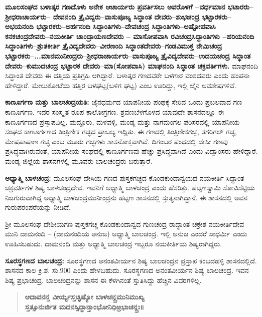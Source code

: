 \textbf{ಮೂಲಸಂಘದ ಬಳಾತ್ಕರ ಗಣದೊಳು ಅನೇಕ ಆಚಾರ್ಯರು ಪ್ರವರ್ತಿಸಲು ಅವರೊಳಗೆ –ವರ್ಧಮಾನ ಭಟಾರರು– ಶ‍್ರೀಧರಾಚಾರ್ಯರು– ದೇವನಂದಿ ತ್ರೈವಿದ್ಯರು–ವಾಸುಪೂಜ್ಯ ಸಿದ್ಧಾಂತ ದೇವರು–ಶುಭಚಂದ್ರ ಭಟ್ಟಾರಕರು–ಅಭಯನಂದಿ ಭಟ್ಟಾರಕರು–ಅರ್ಹನಂದಿ ಸಿದ್ಧಾಂತಿಗಳು–ದೇವಚಂದ್ರ ಸಿದ್ಧಾಂತಿಗಳು–ಅಷ್ಟೋಪವಾಸಿ ಕನಕಚಂದ್ರದೇವರು–ನಯಕೀರ್ತಿ ಚಾಂದ್ರಾಯಣದೇವರು – ಮಾಸೋಪವಾಸಿ ರವಿಚಂದ್ರಸಿದ್ಧಾಂತಿಗಳು –ಹರಿಯನಂದಿ ಸಿದ್ಧಾಂತಿಗಳು–ಶ್ರುತಕೀರ್ತಿ ತ್ರೈವಿದ್ಯದೇವರು–ವೀರಣಂದಿ ಸಿದ್ಧಾಂತದೇವರು–ಗಂಡವಿಮುಕ್ತ ನೇಮಿಚಂದ್ರ ಭಟ್ಟಾರಕರು–...ಮಾನಮುನೀಂದ್ರರು–ಶ‍್ರೀಧರಾಚಾರ್ಯರು–ವಾಸುಪೂಜ್ಯ ತ್ರೈವಿದ್ಯದೇವರು–ಉದಯಚಂದ್ರ ಸಿದ್ಧಾಂತ ದೇವರು–ಕುಮುದಚಂದ್ರ ಭಟ್ಟಾರಕ ದೇವರು–ಮಾ(ಸೋಪವಾಸಿ) ಮಾಘನಂದಿ ಸಿದ್ಧಾಂತ ಚಕ್ರವರ್ತಿಗಳು. }ಮಾಘನಂದಿ ಸಿದ್ಧಾಂತ ದೇವರು ಈ ದತ್ತಿಯ ಪ್ರತಿಗ್ರಹಿ ಆಗಿದ್ದಾರೆ. ಬಳಾತ್ಕರ ಗಣದವರೇ ಬಳಗಾರ ವಂಶದವರು ಎಂದು ಹಂಪನಾ ಹೇಳಿದ್ದಾರೆ. ಮೇಲುಕೋಟೆಯ ಹತ್ತಿರ ಬಳಘಟ್ಟ(ಬಳಿಗ ಘಟ್ಟ) ಎಂಬ ಊರಿದ್ದು, ಇಲ್ಲಿ ಜೈನ ಅವಶೇಷಗಳಿವೆ.

\textbf{ಕಾಣೂರ್ಗಣ ಮತ್ತು ಬಾಲಚಂದ್ರಯತಿ:} ಜೈನಧರ್ಮದ ಯಾಪನೀಯ ಪಂಥಕ್ಕೆ ಸೇರಿದ ಒಂದು ಪ್ರಬಲವಾದ ಗಣ ಕಾಣೂರ್ಗಣ. ಇದರ ಸಂಸ್ಕೃತ ರೂಪ ಕಾಲೋಗ್ರಗಣ. ಶ್ರವಣಬೆಳಗೊಳದ ಯಾವುದೇ ಶಾಸನದಲ್ಲೂ ಈ ಕಾಣೂರ್ಗಣದ ಪ್ರಸ್ತಾಪವಿಲ್ಲ. ಮದ್ದೂರು, ಮಳವಳ್ಳಿ, ಮಂಡ್ಯ ಮತ್ತು ನಾಗಮಂಗಲ ಪರಿಸರದಲ್ಲಿ ಯಾಪನೀಯ ಸಂಘದ ಕಾಣೂರ್ಗಣದ ತಿಂತ್ರಿಣೀಕ ಗಚ್ಛದ ಪ್ರಾಬಲ್ಯ ಇದ್ದಿತು. ಈ ಗಣದಲ್ಲಿ ತಿಂತ್ರಿಣೀಕಗಚ್ಛ, ತಗರಿಗಲ್​ ಗಚ್ಛ, ಮೇಷಪಾಷಾಣ ಗಚ್ಛ ಎಂಬ ಮೂರು ಗಚ್ಛಗಳು ಶಾಸನೋಕ್ತವಾಗಿವೆ. ದಿಗಂಬರ ಪಂಥದಲ್ಲಿ ದೇಸೀ ಗಣವು ಪ್ರಸಿದ್ಧವಾಗಿರುವಂತೆ, ಯಾಪನೀಯ ಸಂಘದಲ್ಲಿ ಕಾಣೂರ್ಗಣವು ಹೆಚ್ಚು ಪ್ರಸಿದ್ಧವಾಗಿದೆ ಎಂದು ವಿದ್ವಾಂಸರು ಹೇಳಿದ್ದಾರೆ. ಮಂಡ್ಯ ಜಿಲ್ಲೆಯ ಶಾಸನಗಳಲ್ಲಿ ಮೂವರು ಬಾಲಚಂದ್ರರು ಬರುತ್ತಾರೆ.

\textbf{ಅಧ್ಯಾತ್ಮಿ ಬಾಳಚಂದ್ರ:} ಮೂಲಸಂಘ ದೇಸಿಯ ಗಣದ ಪುಸ್ತಕಗಚ್ಛದ ಕೊಂಡಕುಂದಾನ್ವಯದ ನಯಕೀರ್ತಿ ಸಿದ್ಧಾಂತ ಚಕ್ರವರ್ತಿಗಳ ಶಿಷ್ಯ ಬಾಳಚಂದ್ರದೇವ. ಇವನಿಗೆ ಅಧ್ಯಾತ್ಮಿ ಬಾಳಚಂದ್ರ ಎಂದು ಹೆಸರಿತ್ತು. ಪಟ್ಟಣಸ್ವಾಮಿ ಸೋವಿಸೆಟ್ಟಿಯ ನಿಜಗುರುವಾಗಿದ್ದ ಅಧ್ಯಾತ್ಮಿ ಬಾಳಚಂದ್ರಮುನೀಂದ್ರನು ಹಟ್ಟಣ ಶಾಸನದಲ್ಲಿ ಸ್ತುತ್ಯನಾಗಿದ್ದಾನೆ. ಈ ಶಾಸನದಲ್ಲಿ ಅವನ ಗುರುಪರಂಪರೆಯನ್ನು ನೀಡಿದೆ.

ಶ‍್ರೀ ಮೂಲಸಂಘ ದೇಶೀಯಗಣ ಪುಸ್ತಕಗಚ್ಚ ಕೊಂಡಕುಂದಾನ್ವದ ಗುಣಚಂದ್ರ  ರಾದ್ಧಾಂತ ಚಕ್ರೇಶ ನಯಕೀರ್ತಿದೇವ ಮುನಿ  ದಾಮನಂದಿ – (ದಾಮನಂದಿಯ ಅನುಜ) ಅಧ್ಯಾತ್ಮಿ ಬಾಲಚಂದ್ರ. ಇಲ್ಲಿ ಅನುಜ ಎಂದರೆ ಸಾಧರ್ಮಿ ಎಂದು ಊಹಿಸಬಹುದು. ದಾಮನಂದಿ ಮತ್ತು ಅಧ್ಯಾತ್ಮಿ ಬಾಲಚಂದ್ರ ಇಬ್ಬರೂ ನಯಕೀರ್ತಿಯ ಶಿಷ್ಯರಾಗಿದ್ದರು.

\textbf{ಸೂರಸ್ಥಗಣದ ಬಾಲಚಂದ್ರ:} ಸೂರಸ್ಥಗಣದ ಅನಂತವೀರ್ಯನ ಶಿಷ್ಯ ಬಾಲಚಂದ್ರನ ಪ್ರಸ್ತಾಪ ಕಂಬದಹಳ್ಳಿ ಶಾಸನದಲ್ಲಿದೆ. ಶಾಸನದ ಕಾಲ ಕ್ರಿ.ಶ. ಸು.900 ಎಂದು ಹೇಳಬಹುದು. ಸೂರಸ್ಥಗಣದ ಅನಂತವೀರ್ಯನ ಶಿಷ್ಯ ಬಾಲಚಂದ್ರ. ಇವನ ಶಿಷ್ಯ ಪ್ರಭಾಚಂದ್ರ. ಬಾಲಚಂದ್ರನನ್ನು ಶಾಸನ ಈ ಕೆಳಗಿನಂತೆ ಸ್ತುತಿಸಿದ್ದು ಹೆಚ್ಚಿನ ವಿವರಗಳಿಲ್ಲ.

\begin{verse}
\textbf{ಆದಾವನನ್ತ ವೀರ್ಯ್ಯಸ್ತಚ್ಛಿಷ್ಯೋ ಬಾಳಚನ್ದ್ರಮುನಿಮುಖ್ಯ} \\\textbf{ಸ್ತತ್ಸೂನುರ್ಜಿತ ಮದನಸ್ಸಿದ್ಧಾನ್ತಾಂಭೋನಿಧಿಱ್ರಭಾಚನ್ದ್ರಃ॥}
\end{verse}

